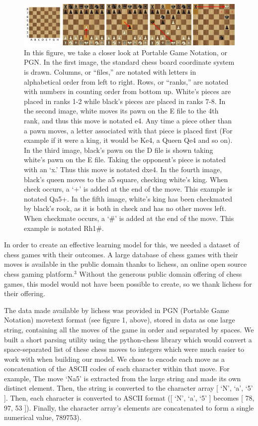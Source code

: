 \documentclass[]{interact}
\theoremstyle{plain}%
\theoremstyle{definition}
\theoremstyle{remark}
\begin{document}
\begin{figure}[H]
\centering
\includegraphics[scale=0.3]{chessmoves.png}
\caption{In this figure, we take a closer look at Portable Game Notation, or PGN. In the first image, the standard chess board coordinate system is drawn. Columns, or “files,” are notated with letters in alphabetical order from left to right. Rows, or “ranks,” are notated with numbers in counting order from bottom up. White’s pieces are placed in ranks 1-2 while black’s pieces are placed in ranks 7-8. In the second image, white moves its pawn on the E file to the 4th rank, and thus this move is notated e4. Any time a piece other than a pawn moves, a letter associated with that piece is placed first (For example if it were a king, it would be Ke4, a Queen Qe4 and so on). In the third image, black’s pawn on the D file is shown taking white’s pawn on the E file. Taking the opponent’s piece is notated with an ‘x.’ Thus this move is notated dxe4. In the fourth image, black’s queen moves to the a5 square, checking white’s king. When check occurs, a ‘+’ is added at the end of the move. This example is notated Qa5+. In the fifth image, white’s king has been checkmated by black’s rook, as it is both in check and has no other moves left. When checkmate occurs, a ‘\#' is added at the end of the move. This example is notated Rh1\#.}
\end{figure}

In order to create an effective learning model for this, we needed a dataset of chess games with their outcomes. A large database of chess games with their moves is available in the public domain thanks to lichess, an online open source chess gaming platform.$^3$ Without the generous public domain offering of chess games, this model would not have been possible to create, so we thank lichess for their offering.

The data made available by lichess was provided in PGN (Portable Game Notation) movetext format (see figure 1, above), stored in data as one large string, containing all the moves of the game in order and separated by spaces. We built a short parsing utility using the python-chess library which would convert a space-separated list of these chess moves to integers which were much easier to work with when building our model. We chose to encode each move as a concatenation of the ASCII codes of each character within that move. For example, The move ‘Na5’ is extracted from the large string and made its own distinct element. Then, the string is converted to the character array [ ‘N’, ‘a’, ‘5’ ]. Then, each character is converted to ASCII format   ([ ‘N’, ‘a’, ‘5’ ] becomes [ 78, 97, 53 ]). Finally, the character array’s elements are concatenated to form a single numerical value, 789753).
\end{document}
